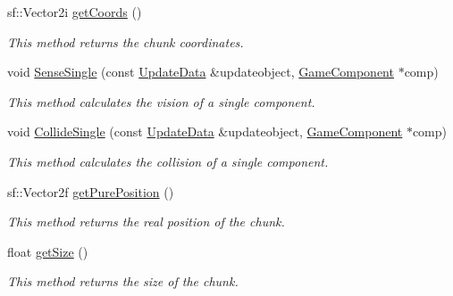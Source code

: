 \begin{DoxyCompactItemize}
sf\-::\-Vector2i \hyperlink{class_chunk_ad8d9253e661bbaef3471b73b86f0d8c4}{get\-Coords} ()
\begin{DoxyCompactList}\small\item\em This method returns the chunk coordinates. \end{DoxyCompactList}\item 
void \hyperlink{class_chunk_ab038489f8de577890226307499da10af}{Sense\-Single} (const \hyperlink{class_update_data}{Update\-Data} \&updateobject, \hyperlink{class_game_component}{Game\-Component} $\ast$comp)
\begin{DoxyCompactList}\small\item\em This method calculates the vision of a single component. \end{DoxyCompactList}\item 
void \hyperlink{class_chunk_a41f009780aa4934be3f839a4518616ed}{Collide\-Single} (const \hyperlink{class_update_data}{Update\-Data} \&updateobject, \hyperlink{class_game_component}{Game\-Component} $\ast$comp)
\begin{DoxyCompactList}\small\item\em This method calculates the collision of a single component. \end{DoxyCompactList}\item 
sf\-::\-Vector2f \hyperlink{class_chunk_a0438a8693210393fadc5105dd315adb8}{get\-Pure\-Position} ()
\begin{DoxyCompactList}\small\item\em This method returns the real position of the chunk. \end{DoxyCompactList}\item 
float \hyperlink{class_chunk_a331e5916d9976679df82da5764bd7d64}{get\-Size} ()
\begin{DoxyCompactList}\small\item\em This method returns the size of the chunk. \end{DoxyCompactList}\end{DoxyCompactItemize}
